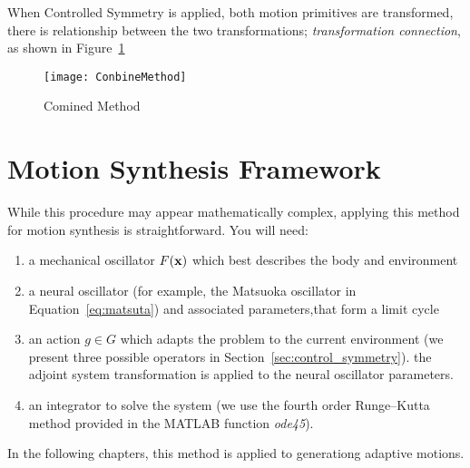 When Controlled Symmetry is applied, both motion primitives are transformed, there is relationship between the two transformations; \emph{transformation connection}, as shown in Figure~\ref{fig:Combine}

\begin{figure}[!htbp]
  \begin{center}
      \texttt{[image: ConbineMethod]}
    \caption{Comined Method}
    \label{fig:Combine}
  \end{center}
\end{figure}

\section{Motion Synthesis Framework}
\label{sec:procframe}
While this procedure may appear mathematically complex, applying this method for motion synthesis is straightforward. 
You will need:
\begin{enumerate}
\item a mechanical oscillator $F(\mathbf{x})$ which best describes the body and environment
\item a neural oscillator (for example, the Matsuoka oscillator in Equation~\ref{eq:matsuta}) and associated parameters,that form a limit cycle

\item an action $g \in G$ which adapts the problem to the current environment (we present three possible operators in Section~\ref{sec:control_symmetry}). the adjoint system transformation  is applied to the neural oscillator parameters.

\item an integrator to solve the system (we use the fourth order Runge--Kutta method provided in the {MATLAB} function \emph{ode45}).
\end{enumerate}
In the following chapters, this method is applied to generationg adaptive motions.



